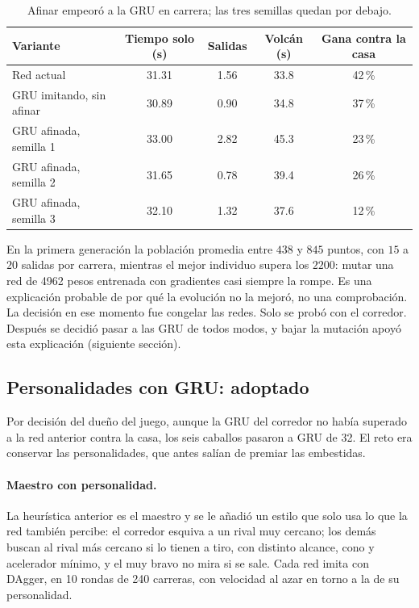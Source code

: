 \documentclass[11pt,letterpaper]{article}
\begin{document}
\begin{table}[h]\centering
\begin{tabular}{lcccc}
\toprule
Variante & Tiempo solo (s) & Salidas & Volcán (s) & Gana contra la casa \\
\midrule
Red actual & 31.31 & 1.56 & 33.8 & 42\,\% \\
GRU imitando, sin afinar & 30.89 & 0.90 & 34.8 & 37\,\% \\
GRU afinada, semilla 1 & 33.00 & 2.82 & 45.3 & 23\,\% \\
GRU afinada, semilla 2 & 31.65 & 0.78 & 39.4 & 26\,\% \\
GRU afinada, semilla 3 & 32.10 & 1.32 & 37.6 & 12\,\% \\
\bottomrule
\end{tabular}
\caption{Afinar empeoró a la GRU en carrera; las tres semillas quedan por debajo.}
\end{table}

En la primera generación la población promedia entre $438$ y $845$ puntos, con $15$ a $20$ salidas por carrera, mientras el mejor individuo supera los $2200$: mutar una red de 4962 pesos entrenada con gradientes casi siempre la rompe. Es una explicación probable de por qué la evolución no la mejoró, no una comprobación. La decisión en ese momento fue congelar las redes. Solo se probó con el corredor. Después se decidió pasar a las GRU de todos modos, y bajar la mutación apoyó esta explicación (siguiente sección).

\subsection{Personalidades con GRU: adoptado}
Por decisión del dueño del juego, aunque la GRU del corredor no había superado a la red anterior contra la casa, los seis caballos pasaron a GRU de 32. El reto era conservar las personalidades, que antes salían de premiar las embestidas.

\paragraph{Maestro con personalidad.} La heurística anterior es el maestro y se le añadió un estilo que solo usa lo que la red también percibe: el corredor esquiva a un rival muy cercano; los demás buscan al rival más cercano si lo tienen a tiro, con distinto alcance, cono y acelerador mínimo, y el muy bravo no mira si se sale. Cada red imita con DAgger, en 10 rondas de 240 carreras, con velocidad al azar en torno a la de su personalidad.
\end{document}
